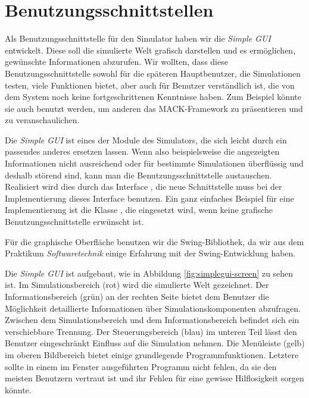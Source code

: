 \section{Benutzungsschnittstellen}\label{subsec:real_interfaces}

Als Benutzungsschnittstelle für den Simulator haben wir die \emph{Simple GUI} entwickelt. Diese soll die simulierte Welt grafisch darstellen und es ermöglichen, gewünschte Informationen abzurufen. Wir wollten, dass diese Benutzungsschnittstelle sowohl für die späteren Hauptbenutzer, die Simulationen testen, viele Funktionen bietet, aber auch für Benutzer verständlich ist, die von dem System noch keine fortgeschrittenen Kenntnisse haben. Zum Beispiel könnte sie auch benutzt werden, um anderen das MACK-Framework zu präsentieren und zu veranschaulichen.

Die \emph{Simple GUI} ist eines der Module des Simulators, die sich leicht durch ein passendes anderes ersetzen lassen. Wenn also beispielsweise die angezeigten Informationen nicht ausreichend oder für bestimmte Simulationen überflüssig und deshalb störend sind, kann man die Benutzungsschnittstelle austauschen. Realisiert wird dies durch das Interface , die neue Schnittstelle muss bei der Implementierung dieses Interface benutzen. Ein ganz einfaches Beispiel für eine Implementierung ist die Klasse , die eingesetzt wird, wenn keine grafische Benutzungsschnittstelle erwünscht ist.

Für die graphische Oberfläche benutzen wir die Swing-Bibliothek, da wir aus dem Praktikum \emph{Softwaretechnik} einige Erfahrung mit der Swing-Entwicklung haben.

Die \emph{Simple GUI} ist aufgebaut, wie in Abbildung \ref{fig:simplegui-screen} zu sehen ist. Im Simulationsbereich (rot) wird die simulierte Welt gezeichnet. Der Informationsbereich (grün) an der rechten Seite bietet dem Benutzer die Möglichkeit detaillierte Informationen über Simulationskomponenten abzufragen. Zwischen dem Simulationsbereich und dem Informationsbereich befindet sich ein verschiebbare Trennung. Der Steuerungsbereich (blau) im unteren Teil lässt den Benutzer eingeschränkt Einfluss auf die Simulation nehmen. Die Menüleiste (gelb) im oberen Bildbereich bietet einige grundlegende Programmfunktionen. Letztere sollte in einem im Fenster ausgeführten Programm nicht fehlen, da sie den meisten Benutzern vertraut ist und ihr Fehlen für eine gewisse Hilflosigkeit sorgen könnte. 

